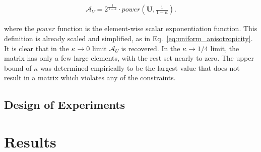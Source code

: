 \documentclass[11pt]{afthesis}
\begin{document}
	
	\begin{align}
	\boldsymbol{\mathcal{A}}_V =  2^{\frac{1}{1-\kappa}} \cdot power\left(\boldsymbol{U}, {\frac{1}{1-\kappa}}\right).
	\end{align}
	
	\noindent where the $power$ function is the element-wise scalar exponentiation function. This definition is already scaled and simplified, as in Eq.~\ref{eq:uniform_anisotropicity}. It is clear that in the $\kappa \rightarrow 0$ limit $\boldsymbol{\mathcal{A}}_U$ is recovered. In the $\kappa \rightarrow 1/4$ limit, the matrix has only a few large elements, with the rest set nearly to zero. The upper bound of $\kappa$ was determined empirically to be the largest value that does not result in a matrix which violates any of the constraints.

	\section{Design of Experiments}
	
	
	\chapter{Results}
	
	\makeatletter
	\def\fixedlabel#1#2{%
		\@bsphack%
		\protected@write\@auxout{}%
		{\string\newlabel{#1}{{#2}{\thepage}}}%
		\@esphack}
	\makeatother
	
\end{document}
